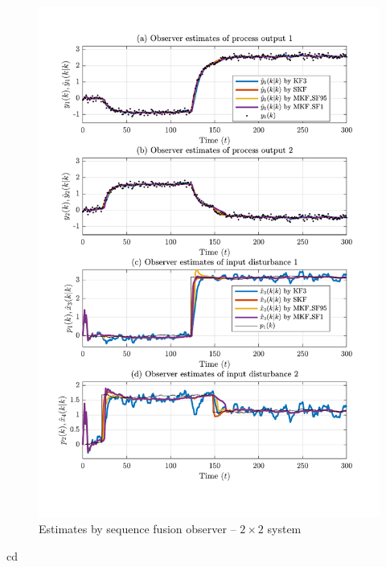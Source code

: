 \begin{figure}[htp]
	\centering
	\includegraphics[width=13cm]{images/rod_obs_sim2_all_seed_y_est1_SF1.pdf}
	\caption{Estimates by sequence fusion observer –  $2\times2$ system}
	\label{fig:rod-obs-sim2-yest-1-SF}
\end{figure}cd 

